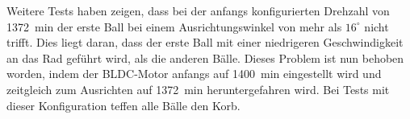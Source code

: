\noindent
Weitere Tests haben zeigen, dass bei der anfangs konfigurierten Drehzahl von 
1372\si{\per\minute} der erste Ball bei einem Ausrichtungswinkel von mehr als 
$16^\circ$ nicht trifft. Dies liegt daran, dass der erste Ball mit einer 
niedrigeren Geschwindigkeit an das Rad geführt wird, als die anderen Bälle. 
Dieses Problem ist nun behoben worden, indem der BLDC-Motor anfangs auf 
1400\si{\per\minute} eingestellt wird und zeitgleich zum Ausrichten auf 
1372\si{\per\minute} heruntergefahren wird. Bei Tests mit dieser Konfiguration 
teffen alle Bälle den Korb.
